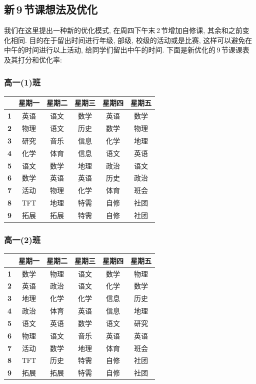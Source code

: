 \documentclass[a4paper]{article}
\begin{document}
 \subsection{新\,9\,节课想法及优化}
  我们在这里提出一种新的优化模式, 在周四下午末\,2\,节增加自修课, 其余和之前变化相同. 目的在于留出时间进行年级, 部级, 校级的活动或是比赛, 这样可以避免在中午的时间进行以上活动, 给同学们留出中午的时间. 下面是新优化的\,9\,节课课表及其打分和优化率:
  \subsubsection{高一(1)班}
   \begin{tabular}{|c|c|c|c|c|c|}
   \hline
   & \bf 星期一 & \bf 星期二 & \bf 星期三 & \bf 星期四 & \bf 星期五 \\\hline
   \bf 1 & 英语 & 语文 & 数学 & 英语 & 数学 \\\hline
   \bf 2 & 物理 & 语文 & 历史 & 数学 & 物理 \\\hline
   \bf 3 & 研究 & 音乐 & 信息 & 化学 & 地理 \\\hline
   \bf 4 & 化学 & 体育 & 信息 & 语文 & 英语 \\\hline
   \bf 5 & 语文 & 数学 & 地理 & 政治 & 语文 \\\hline
   \bf 6 & 数学 & 英语 & 英语 & 历史 & 政治 \\\hline
   \bf 7 & 活动 & 物理 & 化学 & 体育 & 班会 \\\hline
   \bf 8 & TFT  & 地理 & 特需 & 自修 & 社团 \\\hline
   \bf 9 & 拓展 & 拓展 & 特需 & 自修 & 社团 \\\hline
   \end{tabular}
  \subsubsection{高一(2)班}
   \begin{tabular}{|c|c|c|c|c|c|}
   \hline
   & \bf 星期一 & \bf 星期二 & \bf 星期三 & \bf 星期四 & \bf 星期五 \\\hline
   \bf 1 & 数学 & 物理 & 语文 & 数学 & 物理 \\\hline
   \bf 2 & 英语 & 政治 & 语文 & 化学 & 数学 \\\hline
   \bf 3 & 地理 & 化学 & 化学 & 信息 & 历史 \\\hline
   \bf 4 & 政治 & 体育 & 英语 & 信息 & 地理 \\\hline
   \bf 5 & 语文 & 英语 & 数学 & 语文 & 研究 \\\hline
   \bf 6 & 物理 & 语文 & 音乐 & 英语 & 英语 \\\hline
   \bf 7 & 活动 & 数学 & 地理 & 体育 & 班会 \\\hline
   \bf 8 & TFT  & 历史 & 特需 & 自修 & 社团 \\\hline
   \bf 9 & 拓展 & 拓展 & 特需 & 自修 & 社团 \\\hline
   \end{tabular}
\end{document}
